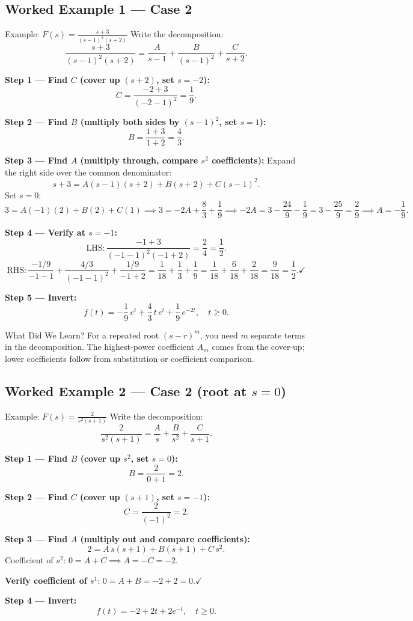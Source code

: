 \documentclass[12pt,a4paper]{article}
\begin{document}
\subsection{Worked Example 1 --- Case 2}
\begin{infobox}{Example: $F(s)=\frac{s+3}{(s-1)^2(s+2)}$}
Write the decomposition:
\[
  \frac{s+3}{(s-1)^2(s+2)} = \frac{A}{s-1} + \frac{B}{(s-1)^2} + \frac{C}{s+2}.
\]

\textbf{Step 1 --- Find $C$ (cover up $(s+2)$, set $s=-2$):}
\[
  C = \frac{-2+3}{(-2-1)^2} = \frac{1}{9}.
\]

\textbf{Step 2 --- Find $B$ (multiply both sides by $(s-1)^2$, set $s=1$):}
\[
  B = \frac{1+3}{1+2} = \frac{4}{3}.
\]

\textbf{Step 3 --- Find $A$ (multiply through, compare $s^2$ coefficients):}
Expand the right side over the common denominator:
\[
  s+3 = A(s-1)(s+2) + B(s+2) + C(s-1)^2.
\]
Set $s=0$:
\[
  3 = A(-1)(2) + B(2) + C(1) \implies 3 = -2A + \frac{8}{3} + \frac{1}{9}
  \implies -2A = 3 - \frac{24}{9} - \frac{1}{9} = 3 - \frac{25}{9}
  = \frac{2}{9} \implies A = -\frac{1}{9}.
\]

\textbf{Step 4 --- Verify at $s=-1$:}
\[
  \text{LHS}: \frac{-1+3}{(-1-1)^2(-1+2)} = \frac{2}{4} = \frac{1}{2}.
\]
\[
  \text{RHS}: \frac{-1/9}{-1-1}+\frac{4/3}{(-1-1)^2}+\frac{1/9}{-1+2}
  = \frac{1}{18}+\frac{1}{3}+\frac{1}{9} = \frac{1}{18}+\frac{6}{18}+\frac{2}{18}
  = \frac{9}{18} = \frac{1}{2}.\checkmark
\]

\textbf{Step 5 --- Invert:}
\[
  f(t) = -\frac{1}{9}\,e^{t} + \frac{4}{3}\,t\,e^{t} + \frac{1}{9}\,e^{-2t},\quad t\geq 0.
\]
\end{infobox}

\begin{learnbox}{What Did We Learn?}
For a repeated root $(s-r)^m$, you need $m$ separate terms in the
decomposition. The highest-power coefficient $A_m$ comes from the cover-up;
lower coefficients follow from substitution or coefficient comparison.
\end{learnbox}

\subsection{Worked Example 2 --- Case 2 (root at $s=0$)}
\begin{infobox}{Example: $F(s)=\frac{2}{s^2(s+1)}$}
Write the decomposition:
\[
  \frac{2}{s^2(s+1)} = \frac{A}{s} + \frac{B}{s^2} + \frac{C}{s+1}.
\]

\textbf{Step 1 --- Find $B$ (cover up $s^2$, set $s=0$):}
\[
  B = \frac{2}{0+1} = 2.
\]

\textbf{Step 2 --- Find $C$ (cover up $(s+1)$, set $s=-1$):}
\[
  C = \frac{2}{(-1)^2} = 2.
\]

\textbf{Step 3 --- Find $A$ (multiply out and compare coefficients):}
\[
  2 = A\,s(s+1) + B(s+1) + C\,s^2.
\]
Coefficient of $s^2$: $0 = A + C \implies A = -C = -2$.

\textbf{Verify coefficient of $s^1$}: $0 = A + B = -2+2 = 0.\checkmark$

\textbf{Step 4 --- Invert:}
\[
  f(t) = -2 + 2t + 2e^{-t},\quad t\geq 0.
\]
\end{infobox}
\end{document}
